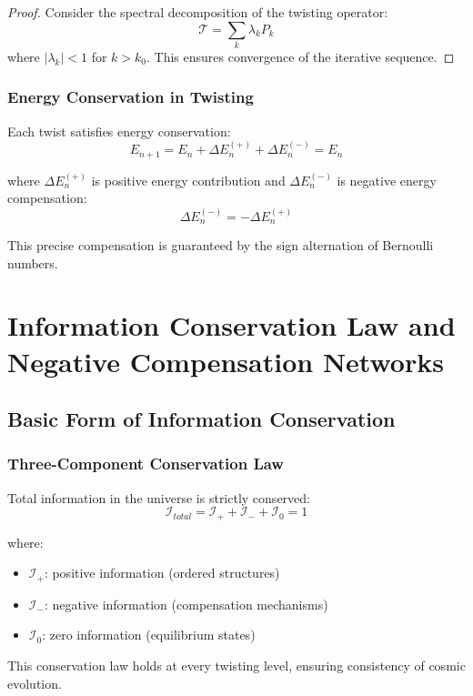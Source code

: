 \documentclass[11pt]{article}
\begin{document}
\begin{proof}
Consider the spectral decomposition of the twisting operator:
$$\mathcal{T} = \sum_{k} \lambda_k P_k$$
where $|\lambda_k| < 1$ for $k > k_0$. This ensures convergence of the iterative sequence.
\end{proof}

\subsubsection{Energy Conservation in Twisting}

Each twist satisfies energy conservation:
$$E_{n+1} = E_n + \Delta E_n^{(+)} + \Delta E_n^{(-)} = E_n$$

where $\Delta E_n^{(+)}$ is positive energy contribution and $\Delta E_n^{(-)}$ is negative energy compensation:
$$\Delta E_n^{(-)} = -\Delta E_n^{(+)}$$

This precise compensation is guaranteed by the sign alternation of Bernoulli numbers.

\section{Information Conservation Law and Negative Compensation Networks}

\subsection{Basic Form of Information Conservation}

\subsubsection{Three-Component Conservation Law}

Total information in the universe is strictly conserved:
$$\mathcal{I}_{total} = \mathcal{I}_+ + \mathcal{I}_- + \mathcal{I}_0 = 1$$

where:
\begin{itemize}
\item $\mathcal{I}_+$: positive information (ordered structures)
\item $\mathcal{I}_-$: negative information (compensation mechanisms)
\item $\mathcal{I}_0$: zero information (equilibrium states)
\end{itemize}

This conservation law holds at every twisting level, ensuring consistency of cosmic evolution.
\end{document}
